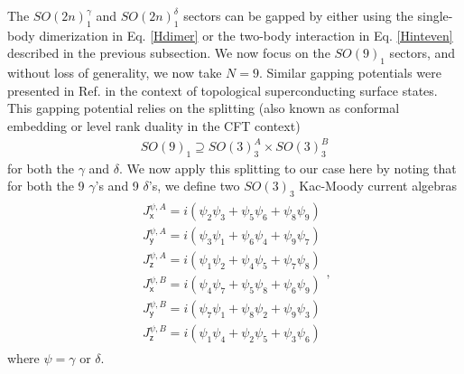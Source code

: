 The $SO(2n)_1^\gamma$ and $SO(2n)_1^\delta$ sectors can be gapped by either using the single-body dimerization in Eq. \eqref{Hdimer} or the two-body interaction in Eq. \eqref{Hinteven} described in the previous subsection. We now focus on the $SO(9)_1$ sectors, and without loss of generality, we now take $N=9$. Similar gapping potentials were presented in Ref.\cite{PhysRevB.94.165142} in the context of topological superconducting surface states. This gapping potential relies on the splitting (also known as conformal embedding or level rank duality in the CFT context) \begin{align}SO(9)_1\supseteq SO(3)_3^A\times SO(3)_3^B\label{SO9SO3AB}\end{align} for both the $\gamma$ and $\delta$. We now apply this splitting to our case here by noting that for both the 9 $\gamma$'s and 9 $\delta$'s, we define two $SO(3)_3$ Kac-Moody current algebras \begin{align}\begin{split}J^{\psi,A}_{\mathsf{x}}=i(\psi_2\psi_3+\psi_5\psi_6+\psi_8\psi_9)\\J^{\psi,A}_{\mathsf{y}}=i(\psi_3\psi_1+\psi_6\psi_4+\psi_9\psi_7)\\J^{\psi,A}_{\mathsf{z}}=i(\psi_1\psi_2+\psi_4\psi_5+\psi_7\psi_8)\\J^{\psi,B}_{\mathsf{x}}=i(\psi_4\psi_7+\psi_5\psi_8+\psi_6\psi_9)\\J^{\psi,B}_{\mathsf{y}}=i(\psi_7\psi_1+\psi_8\psi_2+\psi_9\psi_3)\\J^{\psi,B}_{\mathsf{z}}=i(\psi_1\psi_4+\psi_2\psi_5+\psi_3\psi_6)\end{split},\label{SO33currentdef}\end{align} where $\psi=\gamma$ or $\delta$.

